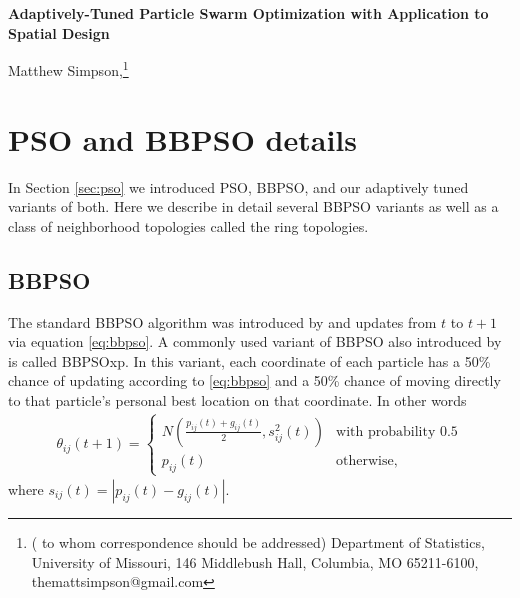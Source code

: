 \documentclass[12pt]{article}
\newcommand{\Appendix}
 {%
 \def\thesection{\Alph{section}}
 \def\thesubsection{\Alph{section}.\arabic{subsection}}
 \def\theequation{\Alph{section}.\arabic{equation}}
 \def\thefigure{\Alph{section}.\arabic{figure}}
 \def\thealg{\Alph{section}.\arabic{alg}}
 }
\begin{document}
\thispagestyle{empty} \baselineskip=28pt

\thispagestyle{empty} \baselineskip=28pt

%
\begin{center}
{\LARGE{\bf Adaptively-Tuned Particle Swarm Optimization with Application to Spatial Design}}
\end{center}


\baselineskip=12pt




\vskip 2mm
\blind
{
  \begin{center}
    Matthew Simpson,\footnote{(\baselineskip=10pt to whom correspondence should be addressed)
      Department of Statistics, University of Missouri,
      146 Middlebush Hall, Columbia, MO 65211-6100, themattsimpson@gmail.com}
  \end{center}
} \fi

\clearpage\pagebreak\newpage {}

\baselineskip=24pt

\Appendix
\section{PSO and BBPSO details}\label{app:psodetail}

In Section \ref{sec:pso} we introduced PSO, BBPSO, and our adaptively tuned variants of both. Here we describe in detail several BBPSO variants as well as a class of neighborhood topologies called the ring topologies.

\subsection{BBPSO}\label{subapp:bbpso}
The standard BBPSO algorithm was introduced by \citet{kennedy2003bare} and updates from $t$ to $t+1$ via equation \eqref{eq:bbpso}. A commonly used variant of BBPSO also introduced by \citet{kennedy2003bare} is called BBPSOxp. In this variant, each coordinate of each particle has a 50\% chance of updating according to \eqref{eq:bbpso} and a 50\% chance of moving directly to that particle's personal best location on that coordinate. In other words
\begin{align}\label{eq:bbpsoxp}
\theta_{ij}(t+1) = \begin{cases} N\left(\frac{p_{ij}(t) + g_{ij}(t)}{2}, s^2_{ij}(t)\right) & \mbox{with probability }0.5\\
p_{ij}(t) &\mbox{otherwise,}\end{cases}
\end{align}
where $s_{ij}(t) = |p_{ij}(t) - g_{ij}(t)|$.
\end{document}
